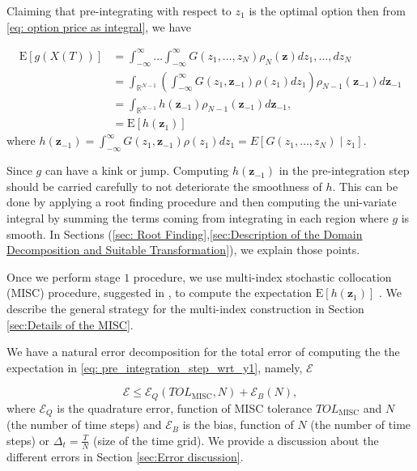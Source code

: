 \documentclass[11pt]{article}
\newcommand{\expt}[1]{\mathrm{E}\left[#1\right]}
\newcommand{\rset}{\mathbb{R}}
\newcommand{\COMMA}{,}
\begin{document}
Claiming that pre-integrating with respect to $z_1$ is the optimal option then from \eqref{eq: option price as integral}, we have

\begin{align}\label{eq: pre_integration_step_wrt_y1}
\expt{g(X(T))}&=\int_{-\infty}^{\infty} \dots \int_{-\infty}^{\infty} G(z_1,\dots,z_N) \rho_N(\mathbf{z}) dz_1,\dots,dz_N \nonumber\\ 
&=\int_{\rset^{N-1}} \left(\int_{-\infty}^\infty G(z_1,\mathbf{z}_{-1}) \rho(z_1) dz_1  \right) \rho_{N-1}(\mathbf{z}_{-1}) d\mathbf{z}_{-1}\nonumber\\	
&=\int_{\rset^{N-1}} h(\mathbf{z}_{-1}) \rho_{N-1}(\mathbf{z}_{-1}) d\mathbf{z}_{-1}\COMMA \\ \nonumber
	&=\expt{h(\mathbf{z}_1)}
\end{align}
where $h(\mathbf{z}_{-1})=\int_{-\infty}^\infty G(z_1,\mathbf{z}_{-1}) \rho(z_1) dz_1=  E\left[ G\left(z_1, \ldots, z_N \right)  \mid z_1\right] $.


Since $g$ can have a kink  or jump. Computing $h(\mathbf{z}_{-1})$ in the pre-integration step should be carried carefully to not deteriorate the smoothness of $h$. This can be done by applying a root finding procedure and then computing the uni-variate integral by summing the terms coming from integrating in each region where $g$ is smooth. In Sections (\ref{sec: Root Finding},\ref{sec:Description of the Domain Decomposition and Suitable Transformation}), we explain those points.



Once we perform stage $1$ procedure,  we use  multi-index stochastic collocation (MISC) procedure, suggested in \cite{haji2016multi}, to compute the expectation $\expt{h(\mathbf{z}_1)}$ . We describe the general strategy for the multi-index construction in Section \ref{sec:Details of the MISC}. 


We have a natural error decomposition for the total error of computing the the expectation in \eqref{eq: pre_integration_step_wrt_y1}, namely, $\mathcal{E}$

\begin{equation}\label{eq:total_error}
\mathcal{E} \le \mathcal{E}_Q(TOL_{\text{MISC}},N) + \mathcal{E}_B(N),
\end{equation}
where  $\mathcal{E}_Q$ is the quadrature error, function of MISC tolerance $TOL_{\text{MISC}}$ and $N$ (the number of time steps)  and  $\mathcal{E}_B$  is the bias, function of $N$ (the number of time steps) or $\Delta_t=\frac{T}{N}$ (size of the time grid). We provide a discussion about the different errors in Section \ref{sec:Error discussion}.
\end{document}
